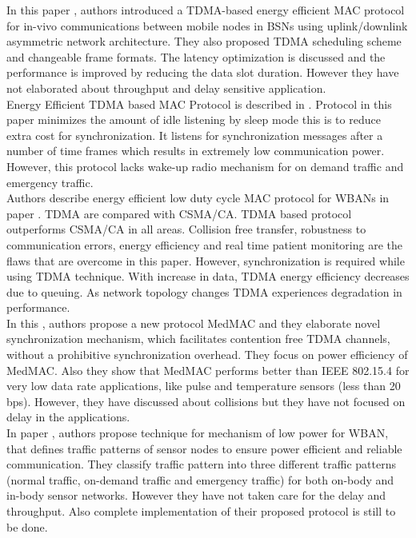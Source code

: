 \documentclass[11pt, conference, compsocconf, onecolumn]{IEEEtran}
\begin{document}
\indent In this paper \cite{12}, authors introduced a TDMA-based energy efficient MAC protocol for in-vivo communications between mobile nodes in BSNs using uplink/downlink asymmetric network architecture. They also proposed TDMA scheduling scheme and changeable frame formats. The latency optimization is discussed and the performance is improved by reducing the data slot duration. However they have not elaborated about throughput and delay sensitive application.\\

\indent Energy Efficient TDMA based MAC Protocol is described in \cite{2}. Protocol in this paper minimizes the amount of idle listening by sleep mode this is to reduce extra cost for synchronization. It listens for synchronization messages after a number of time frames which results in extremely low communication power. However, this protocol lacks wake-up radio mechanism for on demand traffic and emergency traffic.\\

\indent Authors describe energy efficient low duty cycle MAC protocol for WBANs in paper \cite{5}. TDMA are compared with CSMA/CA. TDMA based protocol outperforms CSMA/CA in all areas. Collision free transfer, robustness to communication errors, energy efficiency and real time patient monitoring are the flaws that are overcome in this paper. However, synchronization is required while using TDMA technique. With increase in data, TDMA energy efficiency decreases due to queuing. As network topology changes TDMA experiences degradation in performance.\\


\indent In this \cite{11}, authors propose a new protocol MedMAC and they elaborate novel synchronization mechanism, which facilitates contention free TDMA channels, without a prohibitive synchronization overhead. They focus on power efficiency of MedMAC. Also they show that MedMAC performs better than IEEE 802.15.4 for very low data rate applications, like pulse and temperature sensors (less than 20 bps). However, they have discussed about collisions but they have not focused on delay in the applications.\\

\indent In paper \cite{7}, authors propose technique for mechanism of low power for WBAN, that defines traffic patterns of sensor nodes to ensure power efficient and reliable communication. They classify traffic pattern into three different traffic patterns (normal traffic, on-demand traffic and emergency traffic) for both on-body and in-body sensor networks. However they have not taken care for the delay and throughput. Also complete implementation of their proposed protocol is still to be done.\\
\end{document}
